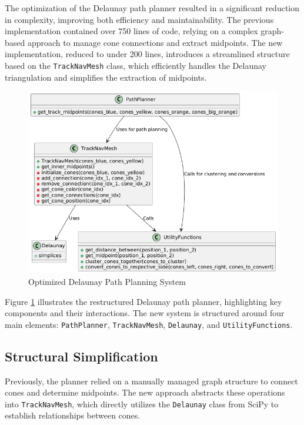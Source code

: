 \documentclass[a4paper,11pt]{report}
\begin{document}
The optimization of the Delaunay path planner resulted in a significant reduction in complexity, improving both efficiency and maintainability. The previous implementation contained over 750 lines of code, relying on a complex graph-based approach to manage cone connections and extract midpoints. The new implementation, reduced to under 200 lines, introduces a streamlined structure based on the \texttt{TrackNavMesh} class, which efficiently handles the Delaunay triangulation and simplifies the extraction of midpoints.

\begin{figure}[h]
    \centering
    \includegraphics[width=\textwidth]{Images/delaunay.png}
    \caption{Optimized Delaunay Path Planning System}
    \label{fig:delaunay_optimization}
\end{figure}

Figure \ref{fig:delaunay_optimization} illustrates the restructured Delaunay path planner, highlighting key components and their interactions. The new system is structured around four main elements: \texttt{PathPlanner}, \texttt{TrackNavMesh}, \texttt{Delaunay}, and \texttt{UtilityFunctions}.

\subsection{Structural Simplification}
Previously, the planner relied on a manually managed graph structure to connect cones and determine midpoints. The new approach abstracts these operations into \texttt{TrackNavMesh}, which directly utilizes the \texttt{Delaunay} class from SciPy to establish relationships between cones.
\end{document}
